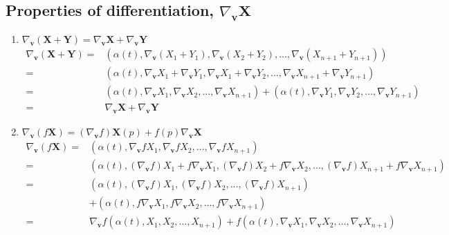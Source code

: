 \subsection{Properties of differentiation, $\nabla_{\boldsymbol{v}} \boldsymbol{X}$}
\begin{enumerate}
	\item $\nabla_{\boldsymbol{v}} (\boldsymbol{X} + \boldsymbol{Y}) = \nabla_{\boldsymbol{v}} \boldsymbol{X} + \nabla_{\boldsymbol{v}} \boldsymbol{Y}$
	\begin{align*}
		\nabla_{\boldsymbol{v}} (\boldsymbol{X}+\boldsymbol{Y}) = & \left( \alpha(t),\nabla_{\boldsymbol{v}}(X_1+Y_1),\nabla_{\boldsymbol{v}} (X_2+Y_2),\dots,\nabla_{\boldsymbol{v}}(X_{n+1}+Y_{n+1}) \right) \\
		= & \left( \alpha(t), \nabla_{\boldsymbol{v}} X_1 + \nabla_{\boldsymbol{v}} Y_1, \nabla_{\boldsymbol{v}} X_1 + \nabla_{\boldsymbol{v}} Y_2, \dots, \nabla_{\boldsymbol{v}} X_{n+1} + \nabla_{\boldsymbol{v}} Y_{n+1} \right) \\
		= & \left( \alpha(t), \nabla_{\boldsymbol{v}} X_1, \nabla_{\boldsymbol{v}} X_2, \dots, \nabla_{\boldsymbol{v}} X_{n+1} \right) + \left( \alpha(t), \nabla_{\boldsymbol{v}} Y_1, \nabla_{\boldsymbol{v}} Y_2, \dots, \nabla_{\boldsymbol{v}} Y_{n+1} \right)\\
		= & \nabla_{\boldsymbol{v}} \boldsymbol{X} + \nabla_{\boldsymbol{v}} \boldsymbol{Y}
	\end{align*}
	\item $\nabla_{\boldsymbol{v}} (f\boldsymbol{X}) = (\nabla_{\boldsymbol{v}} f)\boldsymbol{X}(p) + f(p) \nabla_{\boldsymbol{v}} \boldsymbol{X}$ 
	\begin{align*}
		\nabla_{\boldsymbol{v}} (f\boldsymbol{X}) = & \left( \alpha(t), \nabla_{\boldsymbol{v}} fX_1, \nabla_{\boldsymbol{v}} fX_2, \dots, \nabla_{\boldsymbol{v}} fX_{n+1} \right) \\
		= & \left( \alpha(t), (\nabla_{\boldsymbol{v}} f) X_1  + f\nabla_{\boldsymbol{v}} X_1, (\nabla_{\boldsymbol{v}} f)X_2 + f\nabla_{\boldsymbol{v}} X_2,\dots,(\nabla_{\boldsymbol{v}} f)X_{n+1} + f\nabla_{\boldsymbol{v}} X_{n+1} \right) \\
		= & \left( \alpha(t), (\nabla_{\boldsymbol{v}} f)X_1,(\nabla_{\boldsymbol{v}} f)X_2,\dots,(\nabla_{\boldsymbol{v}} f)X_{n+1} \right)\\
		& + \left( \alpha(t), f\nabla_{\boldsymbol{v}} X_1, f\nabla_{\boldsymbol{v}} X_2,\dots, f\nabla_{\boldsymbol{v}} X_{n+1} \right)\\
		= & \nabla_{\boldsymbol{v}} f (\alpha(t),X_1,X_2,\dots,X_{n+1}) + f(\alpha(t),\nabla_{\boldsymbol{v}} X_1,\nabla_{\boldsymbol{v}} X_2,\dots,\nabla_{\boldsymbol{v}} X_{n+1})\\

\end{align*}
\end{enumerate}
